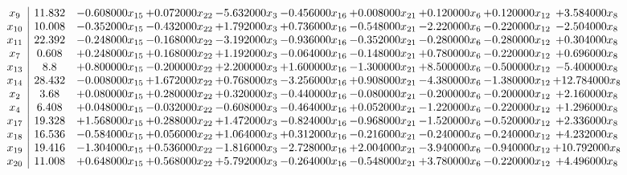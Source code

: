 \documentclass[10pt]{article}
\begin{document}
 \[\begin{array}{c| c c@{\hskip 2pt} c@{\hskip 2pt} c@{\hskip 2pt} c@{\hskip 2pt} c@{\hskip 2pt} c@{\hskip 2pt} c@{\hskip 2pt} c@{\hskip 2pt} }
 x_{9}   &  11.832 & -0.608000 x_{15} & + 0.072000 x_{22} & -5.632000 x_{3} & -0.456000 x_{16} & + 0.008000 x_{21} & + 0.120000 x_{6} & + 0.120000 x_{12} & + 3.584000 x_{8}\\
 x_{10}   &  10.008 & -0.352000 x_{15} & -0.432000 x_{22} & + 1.792000 x_{3} & + 0.736000 x_{16} & -0.548000 x_{21} & -2.220000 x_{6} & -0.220000 x_{12} & -2.504000 x_{8}\\
 x_{11}   &  22.392 & -0.248000 x_{15} & -0.168000 x_{22} & -3.192000 x_{3} & -0.936000 x_{16} & -0.352000 x_{21} & -0.280000 x_{6} & -0.280000 x_{12} & + 0.304000 x_{8}\\
 x_{7}   &  0.608 & + 0.248000 x_{15} & + 0.168000 x_{22} & + 1.192000 x_{3} & -0.064000 x_{16} & -0.148000 x_{21} & + 0.780000 x_{6} & -0.220000 x_{12} & + 0.696000 x_{8}\\
 x_{13}   &  8.8 & + 0.800000 x_{15} & -0.200000 x_{22} & + 2.200000 x_{3} & + 1.600000 x_{16} & -1.300000 x_{21} & + 8.500000 x_{6} & -0.500000 x_{12} & -5.400000 x_{8}\\
 x_{14}   &  28.432 & -0.008000 x_{15} & + 1.672000 x_{22} & + 0.768000 x_{3} & -3.256000 x_{16} & + 0.908000 x_{21} & -4.380000 x_{6} & -1.380000 x_{12} & + 12.784000 x_{8}\\
 x_{2}   &  3.68 & + 0.080000 x_{15} & + 0.280000 x_{22} & + 0.320000 x_{3} & -0.440000 x_{16} & -0.080000 x_{21} & -0.200000 x_{6} & -0.200000 x_{12} & + 2.160000 x_{8}\\
 x_{4}   &  6.408 & + 0.048000 x_{15} & -0.032000 x_{22} & -0.608000 x_{3} & -0.464000 x_{16} & + 0.052000 x_{21} & -1.220000 x_{6} & -0.220000 x_{12} & + 1.296000 x_{8}\\
 x_{17}   &  19.328 & + 1.568000 x_{15} & + 0.288000 x_{22} & + 1.472000 x_{3} & -0.824000 x_{16} & -0.968000 x_{21} & -1.520000 x_{6} & -0.520000 x_{12} & + 2.336000 x_{8}\\
 x_{18}   &  16.536 & -0.584000 x_{15} & + 0.056000 x_{22} & + 1.064000 x_{3} & + 0.312000 x_{16} & -0.216000 x_{21} & -0.240000 x_{6} & -0.240000 x_{12} & + 4.232000 x_{8}\\
 x_{19}   &  19.416 & -1.304000 x_{15} & + 0.536000 x_{22} & -1.816000 x_{3} & -2.728000 x_{16} & + 2.004000 x_{21} & -3.940000 x_{6} & -0.940000 x_{12} & + 10.792000 x_{8}\\
 x_{20}   &  11.008 & + 0.648000 x_{15} & + 0.568000 x_{22} & + 5.792000 x_{3} & -0.264000 x_{16} & -0.548000 x_{21} & + 3.780000 x_{6} & -0.220000 x_{12} & + 4.496000 x_{8}\\

\end{array}\]
\end{document}
